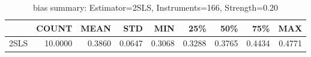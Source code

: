 \begin{table}[ht]
\centering
\caption{bias summary: Estimator=2SLS, Instruments=166, Strength=0.20}
\begin{tabular}{lrrrrrrrr}
\toprule
 & COUNT & MEAN & STD & MIN & 25\% & 50\% & 75\% & MAX \\
\midrule
2SLS & 10.0000 & 0.3860 & 0.0647 & 0.3068 & 0.3288 & 0.3765 & 0.4434 & 0.4771 \\
\bottomrule
\end{tabular}
\end{table}
